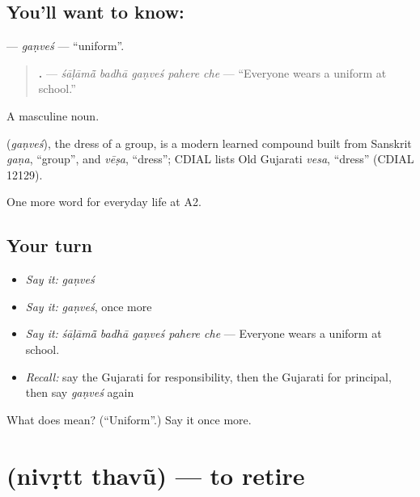 \subsection*{You'll want to know: }
\textbf{} — \emph{gaṇveś} — \textquotedblleft{}uniform\textquotedblright{}.

\begin{quote}
\textbf{    .} — \emph{śāḷāmā̃ badhā gaṇveś pahere che} — \textquotedblleft{}Everyone wears a uniform at school.\textquotedblright{}
\end{quote}

A masculine noun.

\begin{cousinweb}
\textbf{} (\emph{gaṇveś}), the dress of a group, is a modern learned compound built from Sanskrit \emph{gaṇa}, \textquotedblleft{}group\textquotedblright{}, and \emph{vēṣa}, \textquotedblleft{}dress\textquotedblright{}; CDIAL lists Old Gujarati \emph{vesa}, \textquotedblleft{}dress\textquotedblright{} (CDIAL 12129).
\end{cousinweb}

\begin{grammarlens}[title={What you've built}]
One more word for everyday life at A2.
\end{grammarlens}

\subsection*{Your turn}
\begin{itemize}
\raggedright
  \item \emph{Say it:} \emph{gaṇveś}
  \item \emph{Say it:} \emph{gaṇveś}, once more
  \item \emph{Say it:} \emph{śāḷāmā̃ badhā gaṇveś pahere che} — Everyone wears a uniform at school.
  \item \emph{Recall:} say the Gujarati for responsibility, then the Gujarati for principal, then say \emph{gaṇveś} again
\end{itemize}

\begin{tcolorbox}[breakable,colback=teal!4,colframe=teal!35!black,title={Before you move on}]
What does  mean? (\textquotedblleft{}Uniform\textquotedblright{}.) Say it once more.
\end{tcolorbox}
\section[\texorpdfstring{\gu{નિવૃત્ત} \gu{થવું} (nivṛtt thavũ)}{નિવૃત્ત થવું (nivṛtt thavũ)}]{  (nivṛtt thavũ) — to retire}

